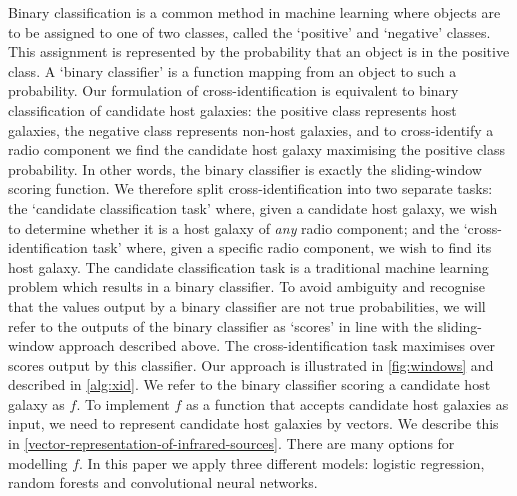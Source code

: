 \documentclass[fleqn,usenatbib,usedcolumn]{mnras}
\newcommand{\edited}[1]{#1}
\begin{document}
    \edited{Binary classification is a common method in machine learning
    where objects are to be assigned to one of two classes,
    called the `positive' and `negative' classes. This assignment is
    represented by the probability that an object is in the positive class. A
    `binary classifier' is a function mapping from an object to such a
    probability. Our formulation of cross-identification is equivalent to
    binary classification of candidate host galaxies: the positive class
    represents host galaxies, the negative class represents non-host galaxies,
    and to cross-identify a radio component we find the candidate host galaxy
    maximising the positive class probability. In other words,
    the binary classifier is exactly the sliding-window scoring function. We therefore split
    cross-identification into two separate tasks: the `candidate
    classification task' where, given a candidate host galaxy, we wish to
    determine whether it is a host galaxy of \emph{any} radio component; and
    the `cross-identification task' where, given a specific radio
    component, we wish to find its host galaxy. The candidate classification task
    is a traditional machine learning problem which results in a binary
    classifier. To avoid ambiguity and recognise that the values output by a
    binary classifier are not true probabilities, we will refer to the outputs
    of the binary classifier as `scores' in line with the sliding-window approach
    described above. The cross-identification task maximises over scores
    output by this classifier. Our approach is illustrated in
    \autoref{fig:windows} and described in \autoref{alg:xid}. We refer to the
    binary classifier scoring a candidate host galaxy as
    $f$. To implement $f$ as a function that accepts candidate host galaxies
    as input, we need to represent candidate host galaxies by vectors. We
    describe this in \autoref{vector-representation-of-infrared-sources}.
    There are many options for modelling $f$. In this paper we apply three
    different models: logistic regression, random forests and convolutional
    neural networks.}
\end{document}
